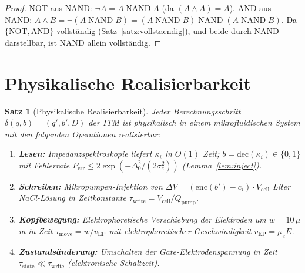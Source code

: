 ﻿\documentclass[a4paper,12pt]{article}
\theoremstyle{plain}
\newtheorem{satz}{Satz}
\theoremstyle{definition}
\theoremstyle{remark}
\begin{document}
\begin{proof}
NOT aus NAND: $\neg A = A \;\mathrm{NAND}\; A$ (da $(A \wedge A) = A$).
AND aus NAND: $A \wedge B = \neg(A \;\mathrm{NAND}\; B) = (A\;\mathrm{NAND}\;B)\;\mathrm{NAND}\;(A\;\mathrm{NAND}\;B)$.
Da $\{\mathrm{NOT}, \mathrm{AND}\}$ vollst\"andig (Satz~\ref{satz:vollstaendig}),
und beide durch NAND darstellbar, ist NAND allein vollst\"andig.
\end{proof}

\section{Physikalische Realisierbarkeit}

\begin{satz}[Physikalische Realisierbarkeit]
\label{satz:phys_real}
Jeder Berechnungsschritt $\delta(q, b) = (q', b', D)$ der ITM ist
physikalisch in einem mikrofluidischen System mit den folgenden
Operationen realisierbar:

\begin{enumerate}[label=(\roman*)]
\item \textbf{Lesen:} Impedanzspektroskopie liefert $\kappa_i$ in $O(1)$ Zeit;
      $b = \mathrm{dec}(\kappa_i) \in \{0,1\}$ mit Fehlerrate
      $P_{\mathrm{err}} \leq 2\exp(-\Delta_0^2/(2\sigma_c^2))$ (Lemma~\ref{lem:inject}).
\item \textbf{Schreiben:} Mikropumpen-Injektion von $\Delta V = (\mathrm{enc}(b') - c_i) \cdot V_{\mathrm{cell}}$
      Liter NaCl-L\"osung in Zeitkonstante $\tau_{\mathrm{write}} = V_{\mathrm{cell}}/Q_{\mathrm{pump}}$.
\item \textbf{Kopfbewegung:} Elektrophoretische Verschiebung der Elektroden
      um $w = 10\,\mu$m in Zeit $\tau_{\mathrm{move}} = w/v_{\mathrm{EP}}$
      mit elektrophoretischer Geschwindigkeit $v_{\mathrm{EP}} = \mu_e E$.
\item \textbf{Zustands\"anderung:} Umschalten der Gate-Elektrodenspannung
      in Zeit $\tau_{\mathrm{state}} \ll \tau_{\mathrm{write}}$ (elektronische Schaltzeit).
\end{enumerate}
\end{satz}
\end{document}
